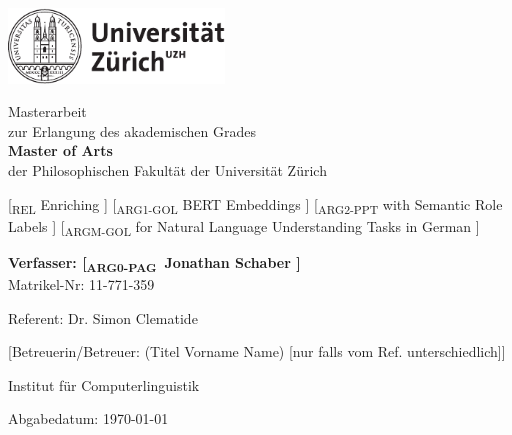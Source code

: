 \begin{titlepage}
\includegraphics[height=20mm]{images/uzh_logo_d_pos}\\

\begin{center}

{\sffamily
Masterarbeit \\
zur Erlangung des akademischen Grades \\
\textbf{Master of Arts} \\
der Philosophischen Fakultät der Universität Zürich \\

\vspace{2cm}

{\Large
        {\color{light-gray} [\textsubscript{REL}} Enriching{\color{light-gray} ]}
        {\color{light-gray} [\textsubscript{ARG1-GOL}} BERT Embeddings{\color{light-gray} ]}
        {\color{light-gray} [\textsubscript{ARG2-PPT}} with Semantic Role Labels{\color{light-gray} ]}
        {\color{light-gray} [\textsubscript{ARGM-GOL}} for Natural Language Understanding Tasks in German{\color{light-gray} ]} %
}\\

\vspace{4cm}

\textbf{Verfasser: {\color{light-gray} [\textsubscript{ARG0-PAG}} Jonathan Schaber{\color{light-gray} ]}} \\
	Matrikel-Nr: 11-771-359 \\

\vspace{2cm}

Referent: Dr. Simon Clematide

[Betreuerin/Betreuer: (Titel Vorname Name) {\small [nur falls vom Ref. unterschiedlich]}]

Institut f\"ur Computerlinguistik

\vfill Abgabedatum: \today

\vspace{3cm}
}
\end{center}

\end{titlepage}

\newpage
